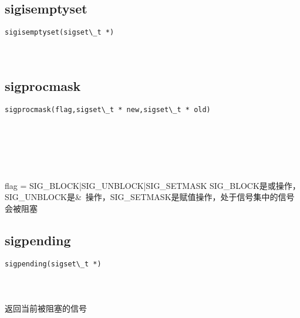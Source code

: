 \documentclass[10pt,a4paper]{article}
\begin{document}
\subsection{sigisemptyset}
\begin{spacing}{2.0}
\lstset{language=C,numbers=none}
\begin{lstlisting}
sigisemptyset(sigset\_t *)
\end{lstlisting}
{\large\color[rgb]{0.2,0.4,0.6}{*:}}
\paragraph{ \ \ }
\end{spacing}

\subsection{sigprocmask}
\begin{spacing}{2.0}
\lstset{language=C,numbers=none}
\begin{lstlisting}
sigprocmask(flag,sigset\_t * new,sigset\_t * old)
\end{lstlisting}
{\large\color[rgb]{0.2,0.4,0.6}{flag:}} \\
{\large\color[rgb]{0.2,0.4,0.6}{new:}} \\
{\large\color[rgb]{0.2,0.4,0.6}{old:}}
\paragraph{ \ \ }flag = SIG\_BLOCK|SIG\_UNBLOCK|SIG\_SETMASK SIG\_BLOCK是或操作，SIG\_UNBLOCK是\&~操作，SIG\_SETMASK是赋值操作，处于信号集中的信号会被阻塞
\end{spacing}

\subsection{sigpending}
\begin{spacing}{2.0}
\lstset{language=C,numbers=none}
\begin{lstlisting}
sigpending(sigset\_t *)
\end{lstlisting}
{\large\color[rgb]{0.2,0.4,0.6}{*:}}
\paragraph{ \ \ }返回当前被阻塞的信号
\end{spacing}
\end{document}
